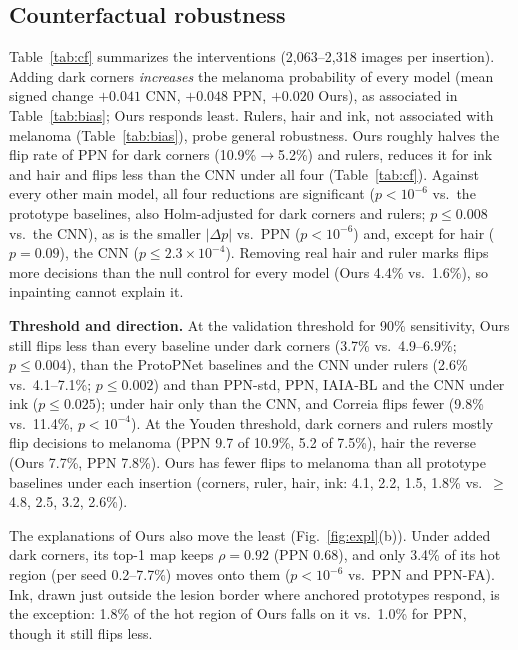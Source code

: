 \documentclass[conference]{IEEEtran}
\begin{document}
\subsection{Counterfactual robustness}
\label{sec:cf}
Table~\ref{tab:cf} summarizes the interventions (2{,}063--2{,}318 images per insertion). Adding dark corners \emph{increases} the melanoma probability of every model (mean signed change $+0.041$ CNN, $+0.048$ PPN, $+0.020$ Ours), as associated in Table~\ref{tab:bias}; Ours responds least. Rulers, hair and ink, not associated with melanoma (Table~\ref{tab:bias}), probe general robustness. Ours roughly halves the flip rate of PPN for dark corners (10.9\%$\rightarrow$5.2\%) and rulers, reduces it for ink and hair and flips less than the CNN under all four (Table~\ref{tab:cf}). Against every other main model, all four reductions are significant ($p<10^{-6}$ vs.\ the prototype baselines, also Holm-adjusted for dark corners and rulers; $p\leq0.008$ vs.\ the CNN), as is the smaller $|\Delta p|$ vs.\ PPN ($p<10^{-6}$) and, except for hair ($p=0.09$), the CNN ($p\leq2.3\times10^{-4}$). Removing real hair and ruler marks flips more decisions than the null control for every model (Ours 4.4\% vs.\ 1.6\%), so inpainting cannot explain it.

\textbf{Threshold and direction.} At the validation threshold for 90\% sensitivity, Ours still flips less than every baseline under dark corners (3.7\% vs.\ 4.9--6.9\%; $p\leq0.004$), than the ProtoPNet baselines and the CNN under rulers (2.6\% vs.\ 4.1--7.1\%; $p\leq0.002$) and than PPN-std, PPN, IAIA-BL and the CNN under ink ($p\leq0.025$); under hair only than the CNN, and Correia flips fewer (9.8\% vs.\ 11.4\%, $p<10^{-4}$). At the Youden threshold, dark corners and rulers mostly flip decisions to melanoma (PPN 9.7 of 10.9\%, 5.2 of 7.5\%), hair the reverse (Ours 7.7\%, PPN 7.8\%). Ours has fewer flips to melanoma than all prototype baselines under each insertion (corners, ruler, hair, ink: 4.1, 2.2, 1.5, 1.8\% vs.\ $\geq$4.8, 2.5, 3.2, 2.6\%).

The explanations of Ours also move the least (Fig.~\ref{fig:expl}(b)). Under added dark corners, its top-1 map keeps $\rho=0.92$ (PPN 0.68), and only 3.4\% of its hot region (per seed 0.2--7.7\%) moves onto them ($p<10^{-6}$ vs.\ PPN and PPN-FA). Ink, drawn just outside the lesion border where anchored prototypes respond, is the exception: 1.8\% of the hot region of Ours falls on it vs.\ 1.0\% for PPN, though it still flips less.
\end{document}
